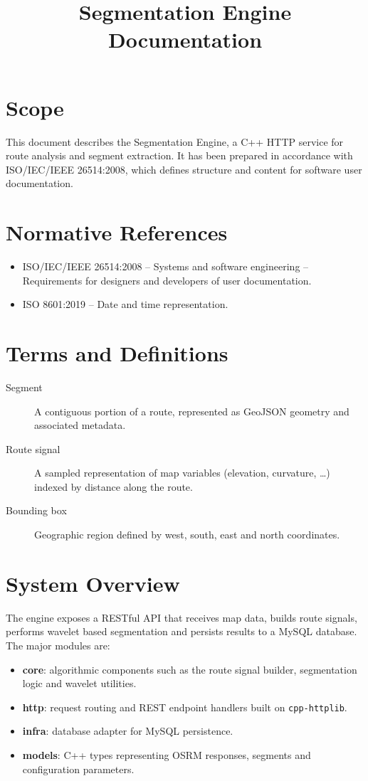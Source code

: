 \documentclass{article}
\begin{document}
\title{Segmentation Engine Documentation}
\maketitle

\section{Scope}
This document describes the Segmentation Engine, a C++ HTTP service for route analysis and segment extraction. It has been prepared in accordance with ISO/IEC/IEEE 26514:2008, which defines structure and content for software user documentation.

\section{Normative References}
\begin{itemize}
\item ISO/IEC/IEEE 26514:2008 -- Systems and software engineering -- Requirements for designers and developers of user documentation.
\item ISO 8601:2019 -- Date and time representation.
\end{itemize}

\section{Terms and Definitions}
\begin{description}
\item[Segment] A contiguous portion of a route, represented as GeoJSON geometry and associated metadata.
\item[Route signal] A sampled representation of map variables (elevation, curvature, \ldots) indexed by distance along the route.
\item[Bounding box] Geographic region defined by west, south, east and north coordinates.
\end{description}

\section{System Overview}
The engine exposes a RESTful API that receives map data, builds route signals, performs wavelet based segmentation and persists results to a MySQL database. The major modules are:
\begin{itemize}
\item \textbf{core}: algorithmic components such as the route signal builder, segmentation logic and wavelet utilities.
\item \textbf{http}: request routing and REST endpoint handlers built on \texttt{cpp-httplib}.
\item \textbf{infra}: database adapter for MySQL persistence.
\item \textbf{models}: C++ types representing OSRM responses, segments and configuration parameters.
\end{itemize}
\end{document}
